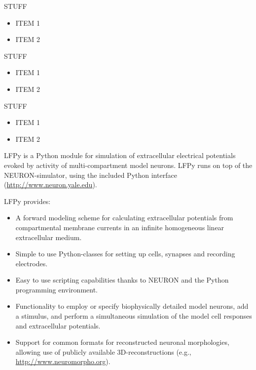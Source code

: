 \begin{multicols}{3}

STUFF

\begin{itemize}[nolistsep,topsep=0em,leftmargin=1pc]
\item ITEM 1
\item ITEM 2
\end{itemize}


STUFF

\begin{itemize}[nolistsep,topsep=0em,leftmargin=1pc]
\item ITEM 1
\item ITEM 2
\end{itemize}


STUFF

\begin{itemize}[nolistsep,topsep=0em,leftmargin=1pc]
\item ITEM 1
\item ITEM 2
\end{itemize}




LFPy is a Python module for simulation of extracellular electrical
potentials evoked by activity of multi-compartment model neurons.
LFPy runs on top of the NEURON-simulator, using the included Python interface
(\url{http://www.neuron.yale.edu}).

LFPy provides:
\begin{itemize}[nolistsep, topsep=0em, leftmargin=1pc]
\item A forward modeling scheme for calculating extracellular potentials from compartmental membrane currents in an infinite homogeneous linear extracellular medium.
\item Simple to use Python-classes for setting up cells, synapses and recording electrodes.
\item Easy to use scripting capabilities thanks to NEURON and the Python programming environment.
\item Functionality to employ or specify biophysically detailed model neurons, add a stimulus, and perform a simultaneous simulation of the model cell responses and extracellular potentials.
\item Support for common formats for reconstructed neuronal morphologies, allowing use of publicly available 3D-reconstructions (e.g., \url{http://www.neuromorpho.org}). 
\end{itemize}



\end{multicols}
